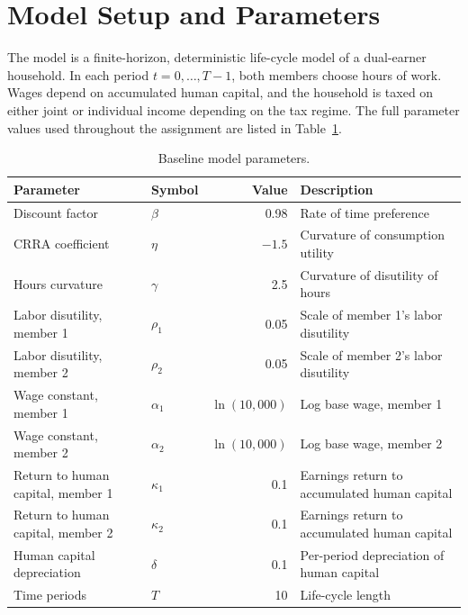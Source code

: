 \section{Model Setup and Parameters}

The model is a finite-horizon, deterministic life-cycle model of a dual-earner household. In each period $t = 0, \ldots, T-1$, both members choose hours of work. Wages depend on accumulated human capital, and the household is taxed on either joint or individual income depending on the tax regime. The full parameter values used throughout the assignment are listed in Table~\ref{tab:params}.

\begin{table}[H]
\centering
\caption{Baseline model parameters.}
\label{tab:params}
\begin{tabularx}{\textwidth}{l l r X}
\hline
\textbf{Parameter} & \textbf{Symbol} & \textbf{Value} & \textbf{Description} \\
\hline
Discount factor            & $\beta$                      & 0.98          & Rate of time preference \\
CRRA coefficient           & $\eta$                       & $-1.5$        & Curvature of consumption utility \\
Hours curvature            & $\gamma$                     & 2.5           & Curvature of disutility of hours \\
Labor disutility, member 1 & $\rho_1$                     & 0.05          & Scale of member 1's labor disutility \\
Labor disutility, member 2 & $\rho_2$                     & 0.05          & Scale of member 2's labor disutility \\
Wage constant, member 1    & $\alpha_1$                   & $\ln(10{,}000)$ & Log base wage, member 1 \\
Wage constant, member 2    & $\alpha_2$                   & $\ln(10{,}000)$ & Log base wage, member 2 \\
Return to human capital, member 1 & $\kappa_1$            & 0.1           & Earnings return to accumulated human capital \\
Return to human capital, member 2 & $\kappa_2$            & 0.1           & Earnings return to accumulated human capital \\
Human capital depreciation & $\delta$                     & 0.1           & Per-period depreciation of human capital \\
Time periods               & $T$                          & 10            & Life-cycle length \\

\end{tabularx}
\end{table}
